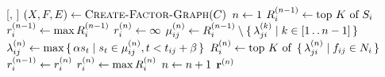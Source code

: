 \begin{function}[H]{\nRiskPropagation}[\vScores, \vContacts]
  \State $(\vVariables, \vFactors, \vEdges) \assign \cCreateFactorGraph[\vContacts]$
  \State $n \leftarrow 1$
  \ForEach{$\vVariable[i] \in \vVariables$}
    \State $R_{i}^{(n - 1)} \leftarrow \text{top } K \text{ of } S_i$
    \State $r_{i}^{(n - 1)} \leftarrow \max R_{i}^{(n - 1)}$
    \State $r_{i}^{(n)} \leftarrow \infty$
  \EndFor
    \ForEach{$\{\vVariable[i], \vFactor[ij]\} \in \vEdges$}
      \State $\mu_{ij}^{(n)} \leftarrow R_{i}^{(n - 1)} \setminus \set{ \lambda_{ji}^{(k)} | k \in [1 \mathinner {\ldotp \ldotp}n - 1]}$
    \EndFor
    \ForEach{$\{\vVariable[i], \vFactor[ij]\} \in \vEdges$}
      \State $\lambda_{ij}^{(n)} \leftarrow \max \set{ \alpha s_t | s_t \in \mu_{ij}^{(n)}, t < t_{ij} + \beta}$
    \EndFor
    \ForEach{$\vVariable[i] \in \vVariables$}
      \State $\vRiskScores{i}{n} \assign \topK{\setBuilder{\vFactorMessage{j}{i}{n}}{\vFactor[ij] \in \vNeighbors_i}}$
    \EndFor
    \ForEach{$\vVariable[i] \in \vVariables$}
      \State $r_{i}^{(n - 1)} \leftarrow r_{i}^{(n)}$
      \State $r_{i}^{(n)} \leftarrow \max R_{i}^{(n)}$
    \EndFor
    \State $n \leftarrow n + 1$
  \EndWhile
  \State \Return $\mathbf{r}^{(n)}$
\end{function}